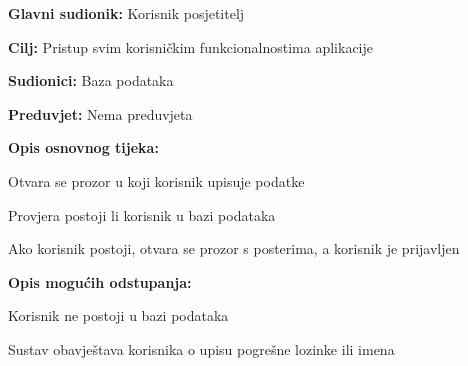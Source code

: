 					\noindent {}
					\begin{packed_item}
						
						\item \textbf{Glavni sudionik: } Korisnik posjetitelj
						\item  \textbf{Cilj:} Pristup svim korisničkim funkcionalnostima aplikacije
						\item  \textbf{Sudionici:} Baza podataka
						\item  \textbf{Preduvjet:} Nema preduvjeta
						\item  \textbf{Opis osnovnog tijeka:}
						
						\item[] \begin{packed_enum}
							
							\item Otvara se prozor u koji korisnik upisuje podatke
							\item Provjera postoji li korisnik u bazi podataka
							\item Ako korisnik postoji, otvara se prozor s posterima, a korisnik je prijavljen
						\end{packed_enum}
						
						\item  \textbf{Opis mogućih odstupanja:}
						
						\item[] \begin{packed_item}
							
							\item[3.a] Korisnik ne postoji u bazi podataka
							\item[] \begin{packed_enum}
								
								\item Sustav obavještava korisnika o upisu pogrešne lozinke ili imena
								
							\end{packed_enum}
							
						\end{packed_item}
					\end{packed_item}
					
